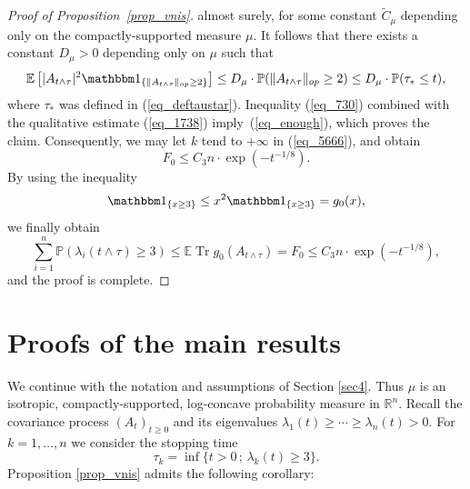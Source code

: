 \documentclass[12pt,a4paper]{article}
\newcommand{\Tr}{\mathop{\mathrm{Tr}}\nolimits}
\newcommand{\E}{\mathbb{E}}
\newcommand{\prob}{\mathbb{P}}
\newcommand{\RR}{\mathbb{R}}
\renewcommand{\tilde}{\widetilde}
\theoremstyle{definition}
\begin{document}
\begin{proof}[Proof of Proposition~\ref{prop_vnis}]
almost surely, for some constant $\tilde{C}_{\mu}$ depending only on the 
compactly-supported measure $\mu$. It follows that there exists a constant $D_\mu > 0$ depending only on
$\mu$ such that
\begin{equation} 
\E \left[ \vert A_{t\wedge \tau} \vert^2
\mathbbm 1_{ \{ \Vert A_{t\wedge \tau} \Vert_{op} \geq 2 \} } \right]
 \leq D_\mu \cdot \prob ( \Vert A_{t\wedge \tau} \Vert_{op} \geq 2 )
\leq D_\mu \cdot \prob ( \tau_* \leq t ),
\label{eq_730} \end{equation}
where $\tau_*$ was defined in (\ref{eq_deftaustar}).
Inequality (\ref{eq_730}) combined with the qualitative estimate (\ref{eq_1738})
imply~(\ref{eq_enough}), which proves the claim. Consequently, we 
may let $k$ tend to $+\infty$ in (\ref{eq_5666}), and obtain
$$ F_0 \leq C_3  n \cdot \exp ( - t^{-1/8} ). $$
By using the inequality
\[
\mathbbm 1_{\{ x\geq 3 \} } \leq x^2 \mathbbm 1_{\{x\geq 3\}}
= g_0 (x)  ,
\]
we finally obtain
\[
\sum_{i=1}^n \prob( \lambda_i ( t\wedge \tau ) \geq 3 )
\leq  \E \Tr g_0 ( A_{t\wedge \tau} )  = F_0 \leq C_3 n \cdot
\exp(-t^{-1/8} )   ,
\]
and the proof is complete. 
\end{proof}
%


\section{Proofs of the main results}
\label{sec6}

We continue with the notation and assumptions of Section \ref{sec4}.
Thus $\mu$ is an isotropic, compactly-supported, log-concave probability measure in $\RR^n$.
Recall the covariance process $(A_t)_{t \geq 0}$ 
and its eigenvalues $\lambda_1 (t) \geq \dotsb \geq \lambda_n (t)>0$.  For  $k= 1, \dotsc,n$ we consider 
the stopping time
$$ 
\tau_k = \inf \{ t >0 \, ; \,  \lambda_{k}(t) \geq 3 \} .
$$
Proposition \ref{prop_vnis} admits the following corollary:
\end{document}
